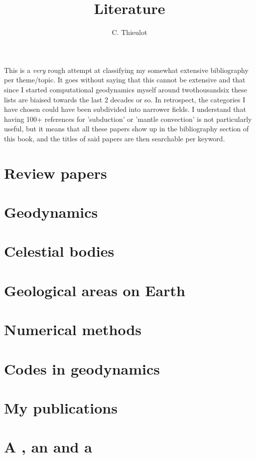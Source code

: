 \documentclass[a4paper,12pt]{report}
\title{Literature}
\author{C. Thieulot}
\begin{document}
\maketitle
\tableofcontents

\newpage
This is a {\it very} rough attempt at classifying my somewhat extensive 
bibliography per theme/topic.
It goes without saying that this cannot be extensive and that since I 
started computational geodynamics myself around twothousandsix these lists are 
biaised towards the last 2 decades or so. 
In retrospect, the categories I have chosen could have been subdivided
into narrower fields. I understand that having 100+ references 
for 'subduction'  or 'mantle convection' is not particularly useful, 
but it means that all these papers show up in the bibliography section 
of this book, and the titles of said papers are then searchable per keyword.

\chapter{Review papers} 

\chapter{Geodynamics} 

\chapter{Celestial bodies} 

\chapter{Geological areas on Earth} 

\chapter{Numerical methods} 

\chapter{Codes in geodynamics } 

\chapter{My publications} 

\chapter{A \fantom, an \elefant and a \ghost} 

\printbibliography
\end{document}

